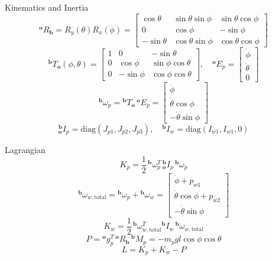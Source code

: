 \begin{frame}{Kinematics and Inertia}
    \small
    \[
    {}^{\mathbf{o}}\!R_{\mathbf{b}}=R_y(\theta)R_x(\phi)=
    \begin{bmatrix}
    \cos\theta & \sin\theta\sin\phi & \sin\theta\cos\phi\\
    0 & \cos\phi & -\sin\phi\\
    -\sin\theta & \cos\theta\sin\phi & \cos\theta\cos\phi
    \end{bmatrix}
    \]
    \[
    {}^{\mathbf{b}}\!T_{\mathbf{o}}(\phi,\theta)=
    \begin{bmatrix}
    1 & 0 & -\sin\theta\\
    0 & \cos\phi & \sin\phi\cos\theta\\
    0 & -\sin\phi & \cos\phi\cos\theta
    \end{bmatrix},
    \quad
    {}^{\mathbf{o}}\!\dot E_p=\begin{bmatrix}\dot\phi\\\dot\theta\\0\end{bmatrix}
    \]
    \[
    {}^{\mathbf{b}}\!\omega_p=
    {}^{\mathbf{b}}\!T_{\mathbf{o}}\,{}^{\mathbf{o}}\!\dot E_p=
    \begin{bmatrix}\dot\phi\\\dot\theta\cos\phi\\-\dot\theta\sin\phi\end{bmatrix}
    \]
    \[
    {}^{\mathbf{b}}_{\mathbf{o}}\!I_p=\mathrm{diag}(J_{p1},J_{p2},J_{p3}),\quad
    {}^{\mathbf{b}}\!I_w=\mathrm{diag}(I_{w1},I_{w1},0)
    \]
\end{frame}

\begin{frame}{Lagrangian}
    \small
    \[
    K_p=\frac{1}{2}\,{}^{\mathbf{b}}\!\omega_p^T\,{}^{\mathbf{b}}_{\mathbf{o}}\!I_p\,{}^{\mathbf{b}}\!\omega_p
    \]
    \[
    {}^{\mathbf{b}}\!\omega_{w,\text{total}}=
    {}^{\mathbf{b}}\!\omega_p+{}^{\mathbf{b}}\!\omega_w=
    \begin{bmatrix}
    \dot\phi+p_{w1}\\
    \dot\theta\cos\phi+p_{w2}\\
    -\dot\theta\sin\phi
    \end{bmatrix}
    \]
    \[
    K_w=\frac{1}{2}\,{}^{\mathbf{b}}\!\omega_{w,\text{total}}^T
    {}^{\mathbf{b}}\!I_w\,{}^{\mathbf{b}}\!\omega_{w,\text{total}}
    \]
    \[
    P={}^\mathbf{o}\!g_p^T\,{}^\mathbf{o}\!R_\mathbf{b}\,{}^\mathbf{b}\!M_p
    =-m_pgl\cos\phi\cos\theta
    \]
    \[
    L=K_p+K_w-P
    \]
\end{frame}


